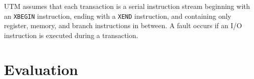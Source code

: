 UTM assumes that each transaction is a serial instruction stream
beginning with an \texttt{XBEGIN} instruction, ending with a
\texttt{XEND} instruction, and containing only register, memory, and
branch instructions in between.  A fault occurs if an I/O instruction
is executed during a transaction.





\section{Evaluation}

